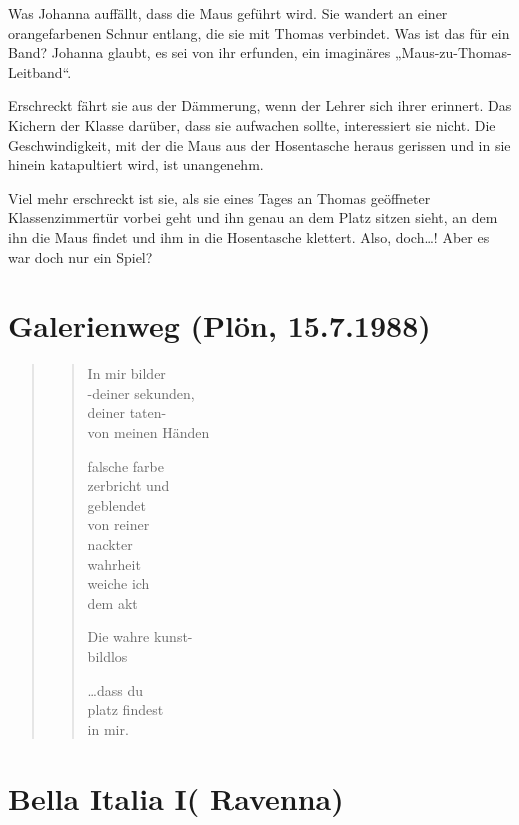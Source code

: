 \documentclass[10pt,titlepage,a5paper]{book}
\newenvironment{tg}{\begin{quote}\em}{\end{quote}}
\begin{document}
Was Johanna auffällt, dass die Maus geführt wird. Sie wandert an einer orangefarbenen Schnur entlang, die sie mit Thomas verbindet. Was ist das für ein Band? Johanna glaubt, es sei von ihr erfunden, ein imaginäres „Maus-zu-Thomas-Leitband“.

Erschreckt fährt sie aus der Dämmerung, wenn der Lehrer sich ihrer erinnert.  Das Kichern der Klasse darüber, dass sie aufwachen sollte, interessiert sie nicht. Die Geschwindigkeit, mit der die Maus aus der Hosentasche heraus gerissen und in sie hinein katapultiert wird, ist unangenehm. 

Viel mehr erschreckt ist sie, als sie eines Tages an Thomas geöffneter Klassenzimmertür vorbei geht und ihn genau an dem Platz sitzen sieht, an dem ihn die Maus findet und ihm in die Hosentasche klettert. Also, doch\dots ! Aber es war doch nur ein Spiel?



\section*{Galerienweg (Plön, 15.7.1988)}


\begin{tg}
\begin{verse}
In mir bilder\\
-deiner sekunden,\\
deiner taten-\\
von meinen Händen


falsche farbe\\
zerbricht
und \\
geblendet\\
von reiner\\
nackter\\
wahrheit\\
weiche ich\\
	dem akt
	

Die wahre kunst-\\
bildlos


\dots dass du\\
platz findest\\
	in mir.
\end{verse}	
\end{tg}	
	
\section*{ Bella Italia I( Ravenna)}
	
\end{document}
